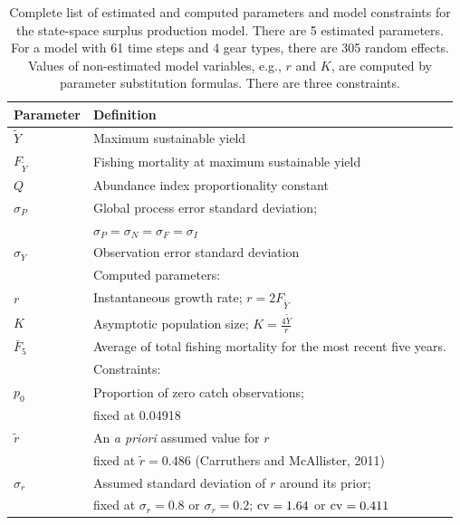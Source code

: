 \documentclass[12pt,letterpaper]{article}
\newcommand\MSY{\widetilde{Y}}
\newcommand\Fmsy{F_{\MSY}}
\begin{document}
\begin{table}
\caption{Complete list of estimated and computed parameters and model
constraints for 
the state-space surplus production model. There are 5 estimated parameters. 
For a model with 61 time steps and 4 gear types, there are 305 random effects.
Values of non-estimated model variables, e.g.,  $r$ and $K$, are computed by
parameter substitution formulas.
There are three constraints.
}
\label{tab:allvars1}
\begin{center}
\begin{tabular}{ll}
\hline
Parameter & Definition\\
\hline
\hline
$\MSY$ & Maximum sustainable yield\\
$\Fmsy$& Fishing mortality at maximum sustainable yield\\
$Q$    & Abundance index proportionality constant\\
$\sigma_P$ & Global process error standard deviation;\\
           & $\sigma_P=\sigma_N=\sigma_F=\sigma_I$\\
$\sigma_Y$ & Observation error standard deviation \\
\hline
       & Computed parameters:\\
$r$    & Instantaneous growth rate; $r=2F_{\MSY}$\\
$K$    & Asymptotic population size; $K=\frac{4\MSY}{r}$\\
$\bar{F}_5$ & Average of total fishing mortality for the most recent
five years.\\
\hline
       & Constraints:\\
$p_0$  & Proportion of zero catch observations;\\
       & fixed at 0.04918\\
$\tilde{r}$ & An {\it a priori} assumed value for $r$\\
            & fixed at $\tilde{r}=0.486$ (Carruthers and McAllister, 2011)\\
$\sigma_r$  & Assumed standard deviation of $r$ around its prior;\\
            & fixed at $\sigma_r=0.8$ or $\sigma_r=0.2$;
            ${\rm cv}=1.64$ or ${\rm cv}=0.411$\\
\hline
\end{tabular}
\end{center}
\end{table}
\end{document}
